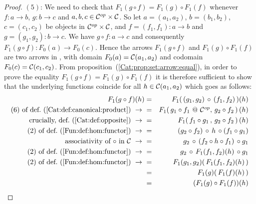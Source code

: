 \begin{proof}
    $(5)$: We need to check that $F_{1}(g\circ f)=F_{1}(g)\circ F_{1}(f)$ 
    whenever $f:a\to b$, $g:b\to c$ and $a,b,c\in\mbox{${\cal C}^{op}$}\times\mbox{$\cal C$}$. So let
    $a=(a_{1},a_{2})$, $b=(b_{1},b_{2})$, $c=(c_{1},c_{2})$ be objects
    in $\mbox{${\cal C}^{op}$}\times\mbox{$\cal C$}$, and $f=(f_{1},f_{1}):a\to b$ and $g=(g_{1},g_{2}):
    b\to c$. We have $g\circ f:a \to c$ and consequently $F_{1}(g\circ f):
    F_{0}(a)\to F_{0}(c)$. Hence the arrows $F_{1}(g\circ f)$ and
    $F_{1}(g)\circ F_{1}(f)$ are two arrows in \Set, with domain
    $F_{0}(a)=\mbox{$\cal C$}(a_{1},a_{2})$ and codomain $F_{0}(c)=\mbox{$\cal C$}(c_{1},c_{2})$.
    From proposition~(\ref{Cat:prop:set:arrow:equal}), in order to prove the 
    equality $F_{1}(g\circ f)=F_{1}(g)\circ F_{1}(f)$ it is therefore sufficient 
    to show that the underlying functions coincide for all $h\in\mbox{$\cal C$}(a_{1},a_{2})$
    which goes as follows:
        \begin{eqnarray*}F_{1}(g\circ f)(h)
            &=&F_{1}(\,(g_{1},g_{2})\,\circ\,(f_{1},f_{2})\,)(h)\\
            \mbox{$(6)$ of def.~(\ref{Cat:def:canonical:product})}\ \to\ 
            &=&F_{1}(\,g_{1} \circ f_{1}\ @\ \Cop,\,g_{2}\circ f_{2}\,)\,(h)\\
            \mbox{crucially, def.~(\ref{Cat:def:opposite})}\ \to\ 
            &=&F_{1}(\,f_{1} \circ g_{1}\,,\,g_{2}\circ f_{2}\,)\,(h)\\
            \mbox{$(2)$ of def.~(\ref{Fun:def:hom:functor})}\ \to\ 
            &=&(g_{2}\circ f_{2})\,\circ\, h\,\circ (f_{1}\circ g_{1})\\
            \mbox{associativity of $\circ$ in \Cat}\ \to\ 
            &=&g_{2}\,\circ\,(f_{2}\circ h\circ f_{1})\,\circ g_{1}\\
            \mbox{$(2)$ of def.~(\ref{Fun:def:hom:functor})}\ \to\ 
            &=&g_{2}\,\circ\,F_{1}(f_{1},f_{2})(h)\,\circ g_{1}\\
            \mbox{$(2)$ of def.~(\ref{Fun:def:hom:functor})}\ \to\ 
            &=&F_{1}(g_{1},g_{2})(\,F_{1}(f_{1},f_{2})(h)\,)\\
            &=&F_{1}(g)(\,F_{1}(f)(h)\,)\\
            &=&(F_{1}(g)\circ F_{1}(f))(h)
        \end{eqnarray*}
\end{proof}
